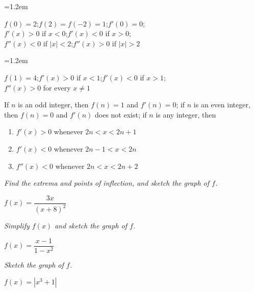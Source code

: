 \documentclass[11pt]{article}
\newcommand{\wsL}{\vspace*{6.5cm}}  %
\newcommand{\prob}[1]{\item[\textbf{#1.}]}
\newcommand{\headnote}[1]{\smallskip\noindent\textit{#1}\par\nopagebreak}
\newenvironment{conds}
  {\begin{list}{}{\leftmargin=1.2em\itemsep=1pt\topsep=3pt\parsep=0pt}\item[]}
  {\end{list}}
\begin{document}
\clearpage

\begin{probs}
  \prob{7}
  \begin{conds}
    $f(0)=2$;\quad $f(2)=f(-2)=1$;\quad $f'(0)=0$;\\
    $f'(x)>0$ if $x<0$;\quad $f'(x)<0$ if $x>0$;\\
    $f''(x)<0$ if $|x|<2$;\quad $f''(x)>0$ if $|x|>2$
  \end{conds}
  \wsL

  \prob{8}
  \begin{conds}
    $f(1)=4$;\quad $f'(x)>0$ if $x<1$;\quad $f'(x)<0$ if $x>1$;\\
    $f''(x)>0$ for every $x\neq 1$
  \end{conds}
  \wsL
\end{probs}

\clearpage

\begin{probs}
  \prob{9} If $n$ is an odd integer, then $f(n)=1$ and $f'(n)=0$; if $n$ is an even
  integer, then $f(n)=0$ and $f'(n)$ does not exist; if $n$ is any integer, then
  \begin{enumerate}[label=\textbf{(\alph*)},leftmargin=2.4em,itemsep=2pt,topsep=4pt]
    \item $f'(x)>0$ whenever $2n<x<2n+1$
    \item $f'(x)<0$ whenever $2n-1<x<2n$
    \item $f''(x)<0$ whenever $2n<x<2n+2$
  \end{enumerate}
  \wsL
\end{probs}

\headnote{Find the extrema and points of inflection, and sketch the graph of $f$.}
\begin{probs}
  \prob{10} $f(x)=\dfrac{3x}{(x+8)^{2}}$ \wsL
\end{probs}

\clearpage

\headnote{Simplify $f(x)$ and sketch the graph of $f$.}
\begin{probs}
  \prob{11} $f(x)=\dfrac{x-1}{1-x^{2}}$ \wsL
\end{probs}

\headnote{Sketch the graph of $f$.}
\begin{probs}
  \prob{12} $f(x)=\left|x^{3}+1\right|$ \wsL
\end{probs}

\clearpage
\end{document}
